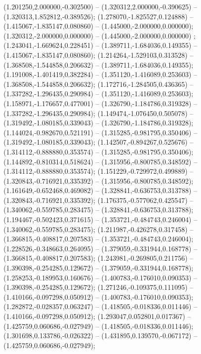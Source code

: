  (1.201250,2.000000,-0.302500) -- (1.320312,2.000000,-0.390625) -- (1.320313,1.852812,-0.389526);
 (1.278070,-1.825527,0.124888) -- (1.415067,-1.835147,0.080860) -- (1.445000,-2.000000,0.000000);
 (1.320312,-2.000000,0.000000) -- (1.445000,-2.000000,0.000000) ;
 (1.243041,-1.669624,0.228451) -- (1.389711,-1.684036,0.149355) -- (1.415067,-1.835147,0.080860);
 (1.214264,-1.529103,0.313528) -- (1.368508,-1.544858,0.206632) -- (1.389711,-1.684036,0.149355);
 (1.191008,-1.401419,0.382284) -- (1.351120,-1.416089,0.253603) -- (1.368508,-1.544858,0.206632);
 (1.172716,-1.284505,0.436365) -- (1.337282,-1.296435,0.290984) -- (1.351120,-1.416089,0.253603);
 (1.158971,-1.176657,0.477001) -- (1.326790,-1.184786,0.319328) -- (1.337282,-1.296435,0.290984);
 (1.149474,-1.076450,0.505078) -- (1.319492,-1.080185,0.339043) -- (1.326790,-1.184786,0.319328);
 (1.144024,-0.982670,0.521191) -- (1.315285,-0.981795,0.350406) -- (1.319492,-1.080185,0.339043);
 (1.142507,-0.894267,0.525676) -- (1.314112,-0.888880,0.353574) -- (1.315285,-0.981795,0.350406);
 (1.144892,-0.810314,0.518624) -- (1.315956,-0.800785,0.348592) -- (1.314112,-0.888880,0.353574);
 (1.151229,-0.729972,0.499889) -- (1.320843,-0.716921,0.335392) -- (1.315956,-0.800785,0.348592);
 (1.161649,-0.652468,0.469082) -- (1.328841,-0.636753,0.313788) -- (1.320843,-0.716921,0.335392);
 (1.176375,-0.577062,0.425547) -- (1.340062,-0.559785,0.283475) -- (1.328841,-0.636753,0.313788);
 (1.194467,-0.502423,0.371615) -- (1.353721,-0.484743,0.246004) -- (1.340062,-0.559785,0.283475);
 (1.211987,-0.426278,0.317458) -- (1.366815,-0.408817,0.207583) -- (1.353721,-0.484743,0.246004);
 (1.228526,-0.348663,0.264095) -- (1.379059,-0.331944,0.168778) -- (1.366815,-0.408817,0.207583);
 (1.243981,-0.269805,0.211756) -- (1.390398,-0.254285,0.129672) -- (1.379059,-0.331944,0.168778);
 (1.258253,-0.189953,0.160676) -- (1.400783,-0.176010,0.090353) -- (1.390398,-0.254285,0.129672);
 (1.271246,-0.109375,0.111095) -- (1.410166,-0.097298,0.050912) -- (1.400783,-0.176010,0.090353);
 (1.282872,-0.028357,0.063247) -- (1.418505,-0.018336,0.011446) -- (1.410166,-0.097298,0.050912);
 (1.293047,0.052801,0.017367) -- (1.425759,0.060686,-0.027949) -- (1.418505,-0.018336,0.011446);
 (1.301698,0.133786,-0.026322) -- (1.431895,0.139570,-0.067172) -- (1.425759,0.060686,-0.027949);
